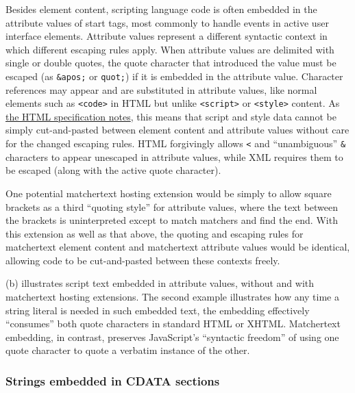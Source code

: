 Besides element content,
scripting language code is often embedded in the attribute values
of \ml start tags,
most commonly to handle events in active user interface elements.
Attribute values represent a different syntactic context
in which different escaping rules apply.
When attribute values are delimited with single or double quotes,
the quote character that introduced the value must be escaped
(as \verb|&apos;| or \verb|quot;|)
if it is embedded in the attribute value.
Character references may appear and are substituted in attribute values,
like normal elements such as \verb|<code>| in HTML
but unlike \verb|<script>| or \verb|<style>| content.
As \href{https://www.w3.org/TR/html401/appendix/notes.html#notes-specifying-data}{the HTML specification notes},
this means that script and style data cannot be simply
cut-and-pasted between element content and attribute values
without care for the changed escaping rules.
HTML forgivingly allows \verb|<| and ``unambiguous'' \verb|&| characters
to appear unescaped in attribute values,
while XML requires them to be escaped (along with the active quote character).

One potential matchertext hosting extension
would be simply to allow square brackets as a third ``quoting style''
for attribute values,
where the text between the brackets is uninterpreted
except to match matchers and find the end.
With this extension as well as that above,
the quoting and escaping rules for matchertext element content
and matchertext attribute values would be identical,
allowing code to be cut-and-pasted between these contexts freely.

(b) illustrates
script text embedded in attribute values,
without and with matchertext hosting extensions.
The second example illustrates how any time
a string literal is needed in such embedded text,
the embedding effectively ``consumes'' both quote characters
in standard HTML or XHTML.
Matchertext embedding, in contrast,
preserves JavaScript's ``syntactic freedom''
of using one quote character to quote a verbatim instance of the other.


\subsubsection{Strings embedded in CDATA sections}
\label{sec:host:ml:section}

